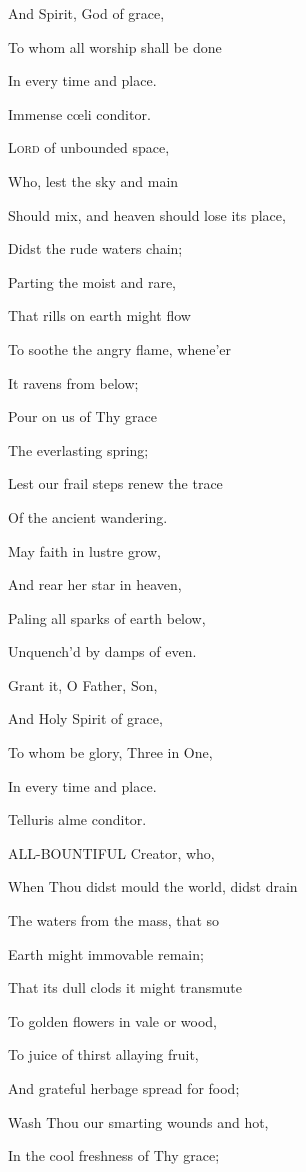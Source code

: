 And Spirit, God of grace,

To whom all worship shall be done

In every time and place.


Immense cœli conditor.

L\textsc{ord} of unbounded space,

Who, lest the sky
and main

Should mix, and heaven should lose its place,

Didst the rude
waters chain;

Parting the moist and rare,

That rills on earth
might flow

To soothe the angry flame, whene'er

It ravens from
below;

Pour on us of Thy grace

The everlasting
spring;

Lest our frail steps renew the trace

Of the ancient
wandering. 

May faith in lustre grow,

And rear her star
in heaven,

Paling all sparks of earth below,

Unquench'd by damps
of even.

Grant it, O Father, Son,

And Holy Spirit of
grace,

To whom be glory, Three in One,

In every time and
place.


Telluris alme conditor.

ALL-BOUNTIFUL Creator, who,

When Thou didst mould the world, didst
drain

The waters from the mass, that so

Earth might immovable remain;

That its dull clods it might transmute

To golden flowers in vale or wood,

To juice of thirst allaying fruit,

And grateful herbage spread for food;

Wash Thou our smarting wounds and hot,

In the cool freshness of Thy grace;


